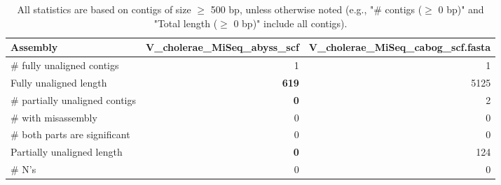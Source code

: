\documentclass[12pt,a4paper]{article}
\begin{document}
\begin{table}[ht]
\begin{center}
\caption{All statistics are based on contigs of size $\geq$ 500 bp, unless otherwise noted (e.g., "\# contigs ($\geq$ 0 bp)" and "Total length ($\geq$ 0 bp)" include all contigs).}
\begin{tabular}{|l*{2}{|r}|}
\hline
Assembly & V\_cholerae\_MiSeq\_abyss\_scf & V\_cholerae\_MiSeq\_cabog\_scf.fasta \\ \hline
\# fully unaligned contigs & 1 & 1 \\ \hline
Fully unaligned length & {\bf 619} & 5125 \\ \hline
\# partially unaligned contigs & {\bf 0} & 2 \\ \hline
\hspace{5mm}\# with misassembly & 0 & 0 \\ \hline
\hspace{5mm}\# both parts are significant & 0 & 0 \\ \hline
Partially unaligned length & {\bf 0} & 124 \\ \hline
\# N's & 0 & 0 \\ \hline
\end{tabular}
\end{center}
\end{table}
\end{document}
